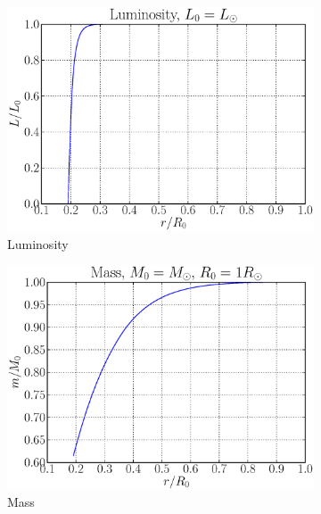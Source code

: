 \documentclass[a4paper, 11pt, english]{article}
\begin{document}
\begin{figure}[htpb]
	\begin{subfigure}{0.49\textwidth}
		\includegraphics[width=\linewidth]{figures/luminosity_initial.eps}
		\caption{Luminosity}
		\label{fig:luminosity_init}
	\end{subfigure}\hfill
	\begin{subfigure}{0.49\textwidth}
		\includegraphics[width=\linewidth]{figures/mass_initial.eps}
		\caption{Mass}
		\label{fig:mass_init}
	\end{subfigure}\hfill
	\vspace{0.35cm}
	\begin{subfigure}{0.49\textwidth}

\end{subfigure}
\end{figure}
\end{document}
